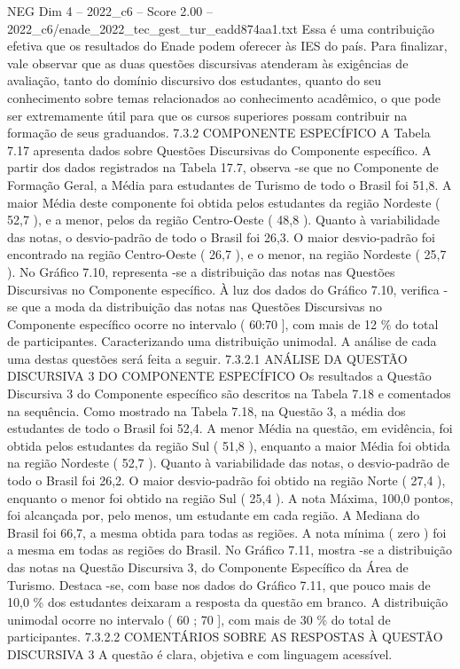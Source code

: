 \begin{textsample}{NEG Dim 4 – 2022\_c6 – Score 2.00 – 2022\_c6/enade\_2022\_tec\_gest\_tur\_eadd874aa1.txt}
Essa é uma contribuição efetiva que os resultados do Enade podem oferecer às IES do país.
Para finalizar, vale observar que as duas questões discursivas atenderam às exigências de avaliação, tanto do domínio discursivo dos estudantes, quanto do seu conhecimento sobre temas relacionados ao conhecimento acadêmico, o que pode ser extremamente útil para que os cursos superiores possam contribuir na formação de seus graduandos. 7.3.2 COMPONENTE ESPECÍFICO A Tabela 7.17 apresenta dados sobre Questões Discursivas do Componente específico.
A partir dos dados registrados na Tabela 17.7, observa -se que no Componente de Formação Geral, a Média para estudantes de Turismo de todo o Brasil foi 51,8.
A maior Média deste componente foi obtida pelos estudantes da região Nordeste ( 52,7 ), e a menor, pelos da região Centro-Oeste ( 48,8 ).
Quanto à variabilidade das notas, o desvio-padrão de todo o Brasil foi 26,3.
O maior desvio-padrão foi encontrado na região Centro-Oeste ( 26,7 ), e o menor, na região Nordeste ( 25,7 ).
No Gráfico 7.10, representa -se a distribuição das notas nas Questões Discursivas no Componente específico.
À luz dos dados do Gráfico 7.10, verifica -se que a moda da distribuição das notas nas Questões Discursivas no Componente específico ocorre no intervalo ( 60:70 ], com mais de 12 \% do total de participantes.
Caracterizando uma distribuição unimodal.
A análise de cada uma destas questões será feita a seguir. 7.3.2.1 ANÁLISE DA QUESTÃO DISCURSIVA 3 DO COMPONENTE ESPECÍFICO Os resultados a Questão Discursiva 3 do Componente específico são descritos na Tabela 7.18 e comentados na sequência.
Como mostrado na Tabela 7.18, na Questão 3, a média dos estudantes de todo o Brasil foi 52,4.
A menor Média na questão, em evidência, foi obtida pelos estudantes da região Sul ( 51,8 ), enquanto a maior Média foi obtida na região Nordeste ( 52,7 ).
Quanto à variabilidade das notas, o desvio-padrão de todo o Brasil foi 26,2.
O maior desvio-padrão foi obtido na região Norte ( 27,4 ), enquanto o menor foi obtido na região Sul ( 25,4 ).
A nota Máxima, 100,0 pontos, foi alcançada por, pelo menos, um estudante em cada região.
A Mediana do Brasil foi 66,7, a mesma obtida para todas as regiões.
A nota mínima ( zero ) foi a mesma em todas as regiões do Brasil.
No Gráfico 7.11, mostra -se a distribuição das notas na Questão Discursiva 3, do Componente Específico da Área de Turismo.
Destaca -se, com base nos dados do Gráfico 7.11, que pouco mais de 10,0 \% dos estudantes deixaram a resposta da questão em branco.
A distribuição unimodal ocorre no intervalo ( 60 ; 70 ], com mais de 30 \% do total de participantes. 7.3.2.2 COMENTÁRIOS SOBRE AS RESPOSTAS À QUESTÃO DISCURSIVA 3 A questão é clara, objetiva e com linguagem acessível.

\end{textsample}
